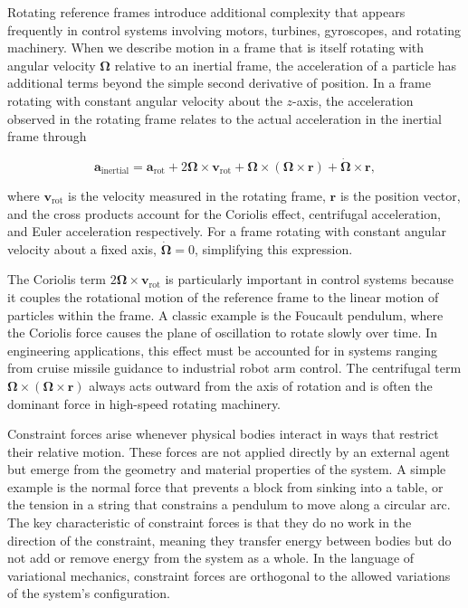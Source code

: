 Rotating reference frames introduce additional complexity that appears frequently in control systems involving motors, turbines, gyroscopes, and rotating machinery. When we describe motion in a frame that is itself rotating with angular velocity $\boldsymbol{\Omega}$ relative to an inertial frame, the acceleration of a particle has additional terms beyond the simple second derivative of position. In a frame rotating with constant angular velocity about the $z$-axis, the acceleration observed in the rotating frame relates to the actual acceleration in the inertial frame through

\[
\mathbf{a}_{\text{inertial}} = \mathbf{a}_{\text{rot}} + 2\boldsymbol{\Omega} \times \mathbf{v}_{\text{rot}} + \boldsymbol{\Omega} \times (\boldsymbol{\Omega} \times \mathbf{r}) + \dot{\boldsymbol{\Omega}} \times \mathbf{r},
\]

where $\mathbf{v}_{\text{rot}}$ is the velocity measured in the rotating frame, $\mathbf{r}$ is the position vector, and the cross products account for the Coriolis effect, centrifugal acceleration, and Euler acceleration respectively. For a frame rotating with constant angular velocity about a fixed axis, $\dot{\boldsymbol{\Omega}} = 0$, simplifying this expression.

The Coriolis term $2\boldsymbol{\Omega} \times \mathbf{v}_{\text{rot}}$ is particularly important in control systems because it couples the rotational motion of the reference frame to the linear motion of particles within the frame. A classic example is the Foucault pendulum, where the Coriolis force causes the plane of oscillation to rotate slowly over time. In engineering applications, this effect must be accounted for in systems ranging from cruise missile guidance to industrial robot arm control. The centrifugal term $\boldsymbol{\Omega} \times (\boldsymbol{\Omega} \times \mathbf{r})$ always acts outward from the axis of rotation and is often the dominant force in high-speed rotating machinery.

Constraint forces arise whenever physical bodies interact in ways that restrict their relative motion. These forces are not applied directly by an external agent but emerge from the geometry and material properties of the system. A simple example is the normal force that prevents a block from sinking into a table, or the tension in a string that constrains a pendulum to move along a circular arc. The key characteristic of constraint forces is that they do no work in the direction of the constraint, meaning they transfer energy between bodies but do not add or remove energy from the system as a whole. In the language of variational mechanics, constraint forces are orthogonal to the allowed variations of the system's configuration.

